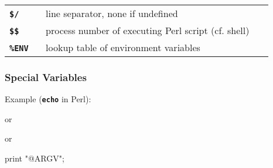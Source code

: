 \begin{frame}
\begin{center}
\begin{tabular}{lll}
   \begin{minipage}{2cm}\textbf{\tt{\$/}} ~\end{minipage}
    & \begin{minipage}{18cm}line separator, none if undefined~\end{minipage}
\\[1ex]

   \begin{minipage}{2cm}\textbf{\tt{\$\$}} ~\end{minipage}
    & \begin{minipage}{18cm}process number of executing Perl script (cf. shell)~\end{minipage}
\\[1ex]

   \begin{minipage}{2cm}\textbf{\tt{\%ENV}} ~\end{minipage}
    & \begin{minipage}{18cm}lookup table of environment variables~\end{minipage}
\\[1ex]
\end{tabular}
\end{center}

\end{frame}

\begin{frame}
\frametitle{Special Variables}
Example (\textbf{\tt{echo}} in Perl):

or

or
\begin{perl}
    print "@ARGV\n";
\end{perl}

\end{frame}




